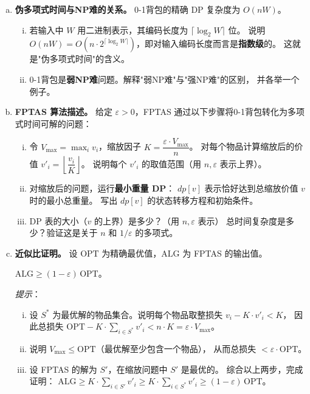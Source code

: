 \documentclass[12pt, a4paper]{ctexart}
\begin{document}
\begin{enumerate}[(a)]
    \item \textbf{伪多项式时间与NP难的关系。}
    0-1背包的精确 DP 复杂度为 $O(nW)$。
    \begin{enumerate}[i.]
        \item 若输入中 $W$ 用二进制表示，其编码长度为 $\lceil \log_2 W \rceil$ 位。
        说明 $O(nW) = O(n \cdot 2^{\lceil \log_2 W \rceil})$，即对输入编码长度而言是\textbf{指数级}的。
        这就是"伪多项式时间"的含义。
        \item 0-1背包是\textbf{弱NP难}问题。解释"弱NP难"与"强NP难"的区别，
        并各举一个例子。
    \end{enumerate}
 
    \item \textbf{FPTAS 算法描述。}
    给定 $\varepsilon > 0$，FPTAS 通过以下步骤将0-1背包转化为多项式时间可解的问题：
 
    \begin{enumerate}[i.]
        \item 令 $V_{\max} = \max_i v_i$，缩放因子 $K = \dfrac{\varepsilon \cdot V_{\max}}{n}$。
        对每个物品计算缩放后的价值 $v'_i = \left\lfloor \dfrac{v_i}{K} \right\rfloor$。
        说明每个 $v'_i$ 的取值范围（用 $n, \varepsilon$ 表示上界）。
        \item 对缩放后的问题，运行\textbf{最小重量 DP}：
        $dp[v]$ 表示恰好达到总缩放价值 $v$ 时的最小总重量。
        写出 $dp[v]$ 的状态转移方程和初始条件。
        \item DP 表的大小（$v$ 的上界）是多少？（用 $n, \varepsilon$ 表示）
        总时间复杂度是多少？验证这是关于 $n$ 和 $1/\varepsilon$ 的多项式。
    \end{enumerate}
 
    \item \textbf{近似比证明。}
    设 $\mathrm{OPT}$ 为精确最优值，$\mathrm{ALG}$ 为 FPTAS 的输出值。
 
    \begin{keypoint}[待证命题]
    $\mathrm{ALG} \geq (1 - \varepsilon)\,\mathrm{OPT}$。
    \end{keypoint}
 
    \textit{提示}：
    \begin{enumerate}[i.]
        \item 设 $S^*$ 为最优解的物品集合。说明每个物品取整损失 $v_i - K \cdot v'_i < K$，
        因此总损失 $\mathrm{OPT} - K \cdot \sum_{i \in S^*} v'_i < n \cdot K = \varepsilon \cdot V_{\max}$。
        \item 说明 $V_{\max} \leq \mathrm{OPT}$（最优解至少包含一个物品），
        从而总损失 $< \varepsilon \cdot \mathrm{OPT}$。
        \item 设 FPTAS 的解为 $S'$，在缩放问题中 $S'$ 是最优的。
        综合以上两步，完成证明：
        $\mathrm{ALG} \geq K \cdot \sum_{i \in S'} v'_i \geq K \cdot \sum_{i \in S^*} v'_i \geq (1-\varepsilon)\,\mathrm{OPT}$。
    \end{enumerate}
 

\end{enumerate}
\end{document}
